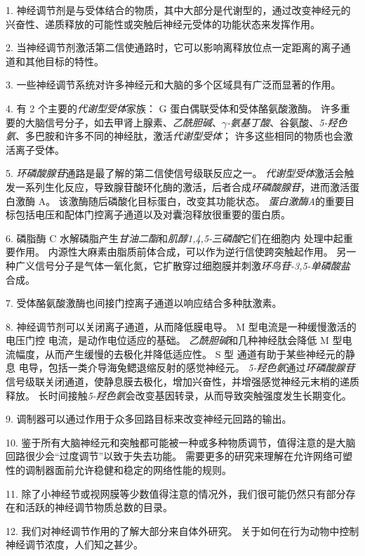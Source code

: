 1. 神经调节剂是与受体结合的物质，其中大部分是代谢型的，通过改变神经元的兴奋性、递质释放的可能性或突触后神经元受体的功能状态来发挥作用。


2. 当神经调节剂激活第二信使通路时，它可以影响离释放位点一定距离的离子通道和其他目标的特性。


3. 一些神经调节系统对许多神经元和大脑的多个区域具有广泛而显著的作用。


4. 有 2 个主要的\textit{代谢型受体}家族：
G 蛋白偶联受体和受体酪氨酸激酶。 
许多重要的大脑信号分子，如去甲肾上腺素、\textit{乙酰胆碱}、\textit{$\gamma$-氨基丁酸}、谷氨酸、\textit{5-羟色氨}、多巴胺和许多不同的神经肽，激活\textit{代谢型受体}；
许多这些相同的物质也会激活离子受体。 


5. \textit{环磷酸腺苷}通路是最了解的第二信使信号级联反应之一。
\textit{代谢型受体}激活会触发一系列生化反应，导致腺苷酸环化酶的激活，后者合成\textit{环磷酸腺苷}，进而激活蛋白激酶 A。
该激酶随后磷酸化目标蛋白，改变其功能状态。
\textit{蛋白激酶A}的重要目标包括电压和配体门控离子通道以及对囊泡释放很重要的蛋白质。 


6. 磷脂酶 C 水解磷脂产生\textit{甘油二酯}和\textit{肌醇1,4,5-三磷酸}它们在细胞内  处理中起重要作用。
内源性大麻素由脂质前体合成，可以作为逆行信使跨突触起作用。
另一种广义信号分子是气体一氧化氮，它扩散穿过细胞膜并刺激\textit{环鸟苷-3,5-单磷酸盐}合成。


7. 受体酪氨酸激酶也间接门控离子通道以响应结合多种肽激素。 


8. 神经调节剂可以关闭离子通道，从而降低膜电导。
M 型电流是一种缓慢激活的电压门控  电流，是动作电位适应的基础。
\textit{乙酰胆碱}和几种神经肽会降低 M 型电流幅度，从而产生缓慢的去极化并降低适应性。
S 型  通道有助于某些神经元的静息  电导，包括一类介导海兔鳃退缩反射的感觉神经元。
\textit{5-羟色氨}通过\textit{环磷酸腺苷}信号级联关闭通道，使静息膜去极化，增加兴奋性，并增强感觉神经元末梢的递质释放。
长时间接触\textit{5-羟色氨}会改变基因转录，从而导致突触强度发生长期变化。 


9. 调制器可以通过作用于众多回路目标来改变神经元回路的输出。 


10. 鉴于所有大脑神经元和突触都可能被一种或多种物质调节，值得注意的是大脑回路很少会“过度调节”以致于失去功能。
需要更多的研究来理解在允许网络可塑性的调制器面前允许稳健和稳定的网络性能的规则。


11. 除了小神经节或视网膜等少数值得注意的情况外，我们很可能仍然只有部分存在和活跃的神经调节物质总数的目录。


12. 我们对神经调节作用的了解大部分来自体外研究。
关于如何在行为动物中控制神经调节浓度，人们知之甚少。





